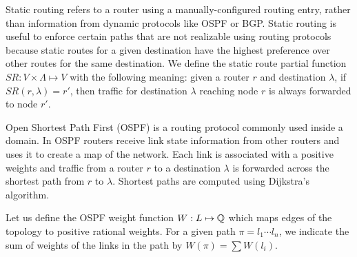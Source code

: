  Static routing refers to a router using a
manually-configured routing entry, rather than information from
dynamic protocols like OSPF or BGP.  Static routing is useful to enforce certain
paths that are not realizable using routing protocols because 
static
routes for a given destination have the highest preference over other routes for the same
destination.  
We define the static route partial
function $SR: V \times \Lambda \mapsto V$ with the following meaning:  
given a router $r$
and destination $\lambda$, if $SR(r,\lambda)=r'$, then traffic for
destination $\lambda$ reaching node $r$ is always forwarded to node
$r'$. 


 Open Shortest Path First (OSPF) is a routing
protocol commonly used inside a domain. In OSPF routers receive link
state information from other routers and uses it to create a map of
the network. Each link is associated with a positive weights and traffic from a router $r$ to
a destination $\lambda$ is forwarded across the shortest path from $r$ to $\lambda$.
Shortest paths are computed using Dijkstra's algorithm.

Let us
define the OSPF weight function $W: L \mapsto \mathbb{Q}$ which 
maps edges of the topology to positive rational weights. 
For a given
path $\pi=l_1\cdots l_n$, we indicate the sum of weights of the
links in the path by $W(\pi)=\sum W(l_i)$. 



